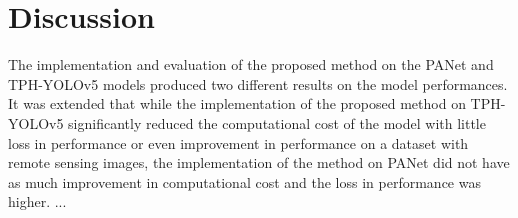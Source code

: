 \chapter{Discussion}

The implementation and evaluation of the proposed method on the PANet and TPH-YOLOv5 models produced two different results on the model performances. It was extended that while the implementation of the proposed method on TPH-YOLOv5 significantly reduced the computational cost of the model with little loss in performance or even improvement in performance on a dataset with remote sensing images, the implementation of the method on PANet did not have as much improvement in computational cost and the loss in performance was higher. ...
